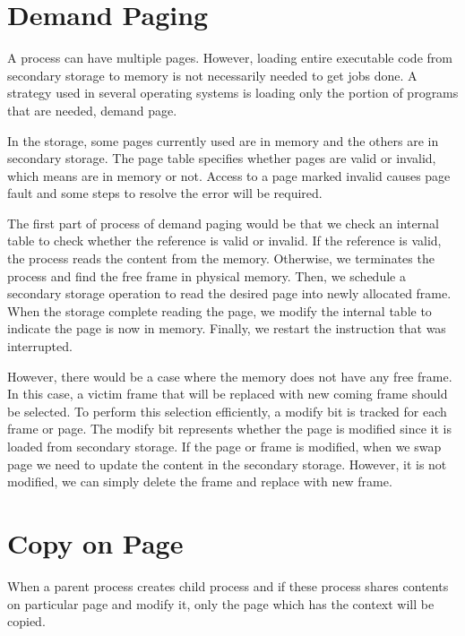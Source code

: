 \section{Demand Paging}
\label{sec:history}
A process can have multiple pages. However, loading entire executable code from secondary storage to memory is not necessarily needed to 
get jobs done. A strategy used in several operating systems is loading only the portion of programs that are needed, demand page. 

In the storage, some pages currently used are in memory and the others are in secondary storage. 
The page table specifies whether pages are valid or invalid, which means are in memory or not. 
Access to a page marked invalid causes page fault and some steps to resolve the error will be required. 

The first part of process of demand paging would be that we check an internal table to check whether the reference is valid or invalid.
If the reference is valid, the process reads the content from the memory. Otherwise, we terminates the process and find the free frame in 
physical memory. Then, we schedule a secondary storage operation to read the desired page into newly allocated frame. 
When the storage complete reading the page, we modify the internal table to indicate the page is now in memory. 
Finally, we restart the instruction that was interrupted. 

However, there would be a case where the memory does not have any free frame. In this case, a victim frame that will be replaced with new coming frame should be selected. 
To perform this selection efficiently, a modify bit is tracked for each frame or page. The modify bit represents whether the page is modified since it is loaded from secondary storage. 
If the page or frame is modified, when we swap page we need to update the content in the secondary storage. However, it is not modified, we can simply delete the frame and replace with new frame.



\section{Copy on Page}
\label{sec:history}
When a parent process creates child process and if these process shares contents on particular page and modify it, 
only the page which has the context will be copied.


